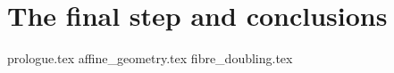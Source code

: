 \documentclass[class=article, crop=false]{standalone}
\begin{document}
\chapter{The final step and conclusions}

{prologue.tex}
{affine_geometry.tex}
{fibre_doubling.tex}
\end{document}
